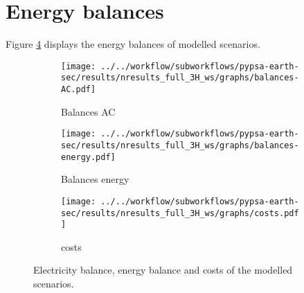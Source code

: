 \section{Energy balances}

Figure \ref{fig:barplots} displays the energy balances of modelled scenarios.


\begin{figure}[h!]
    \centering
    \begin{subfigure}[b]{\linewidth}
        \centering
        \texttt{[image: ../../workflow/subworkflows/pypsa-earth-sec/results/nresults\_full\_3H\_ws/graphs/balances-AC.pdf]}
        \caption{Balances AC}
        \label{fig:balances_AC}
    \end{subfigure}
    
    \vspace{0.5cm} %
    
    \begin{subfigure}[b]{\linewidth}
        \centering
        \texttt{[image: ../../workflow/subworkflows/pypsa-earth-sec/results/nresults\_full\_3H\_ws/graphs/balances-energy.pdf]}
        \caption{Balances energy}
        \label{fig:balances_energy}
    \end{subfigure}

    \vspace{0.5cm} %
    
    \begin{subfigure}[b]{\linewidth}
        \centering
        \texttt{[image: ../../workflow/subworkflows/pypsa-earth-sec/results/nresults\_full\_3H\_ws/graphs/costs.pdf]}
        \caption{costs}
        \label{fig:balances_costs}
    \end{subfigure}
    
    \caption{Electricity balance, energy balance and costs of the modelled scenarios.}
    \label{fig:barplots}
\end{figure}

\clearpage
